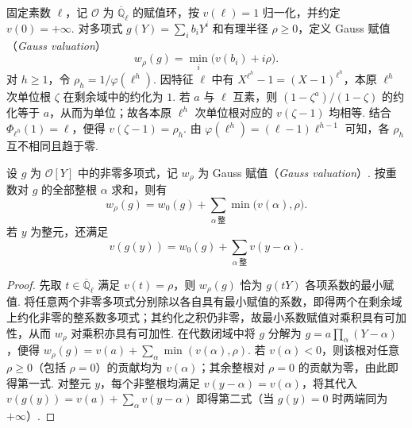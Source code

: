 固定素数 $\ell$，记 $\mathcal O$ 为 $\overline{\mathbb Q}_\ell$ 的赋值环，按 $v(\ell)=1$ 归一化，并约定 $v(0)=+\infty$. 对多项式 $g(Y)=\sum_i b_iY^i$ 和有理半径 $\rho\ge0$，定义 Gauss 赋值（\emph{Gauss valuation}）~\cite{BGR1984}
\[
 w_\rho(g)=\min_i\bigl(v(b_i)+i\rho\bigr).
\]
对 $h\ge1$，令 $\rho_h=1/\varphi(\ell^h)$. 因特征 $\ell$ 中有 $X^{\ell^h}-1=(X-1)^{\ell^h}$，本原 $\ell^h$ 次单位根 $\zeta$ 在剩余域中的约化为 $1$.
若 $a$ 与 $\ell$ 互素，则 $(1-\zeta^a)/(1-\zeta)$ 的约化等于 $a$，从而为单位；故各本原 $\ell^h$ 次单位根对应的 $v(\zeta-1)$ 均相等. 结合 $\Phi_{\ell^h}(1)=\ell$，便得 $v(\zeta-1)=\rho_h$. 由 $\varphi(\ell^h)=(\ell-1)\ell^{h-1}$ 可知，各 $\rho_h$ 互不相同且趋于零.

\begin{lemma}
\label{lem:c-gauss-valuation-roots}
\emitthmsource
设 $g$ 为 $\mathcal O[Y]$ 中的非零多项式，记 $w_\rho$ 为 Gauss 赋值（\emph{Gauss valuation}）. 按重数对 $g$ 的全部整根 $\alpha$ 求和，则有
\[
 w_\rho(g)=w_0(g)+\sum_{\alpha\ \text{整}}\min\bigl(v(\alpha),\rho\bigr).
\]
若 $y$ 为整元，还满足
\[
 v(g(y))=w_0(g)+\sum_{\alpha\ \text{整}}v(y-\alpha).
\]
\end{lemma}
\begin{proof}
先取 $t\in\overline{\mathbb Q}_\ell$ 满足 $v(t)=\rho$，则 $w_\rho(g)$ 恰为 $g(tY)$ 各项系数的最小赋值.
将任意两个非零多项式分别除以各自具有最小赋值的系数，即得两个在剩余域上约化非零的整系数多项式；其约化之积仍非零，故最小系数赋值对乘积具有可加性，从而 $w_\rho$ 对乘积亦具有可加性.
在代数闭域中将 $g$ 分解为 $g=a\prod_\alpha(Y-\alpha)$，便得 $w_\rho(g)=v(a)+\sum_\alpha\min(v(\alpha),\rho)$.
若 $v(\alpha)<0$，则该根对任意 $\rho\ge0$（包括 $\rho=0$）的贡献均为 $v(\alpha)$；其余整根对 $\rho=0$ 的贡献为零，由此即得第一式.
对整元 $y$，每个非整根均满足 $v(y-\alpha)=v(\alpha)$，将其代入 $v(g(y))=v(a)+\sum_\alpha v(y-\alpha)$ 即得第二式（当 $g(y)=0$ 时两端同为 $+\infty$）.
\end{proof}

